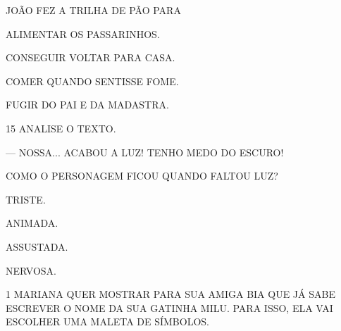 JOÃO FEZ A TRILHA DE PÃO PARA

\begin{escolha}[itemsep=-5pt]
\item ALIMENTAR OS PASSARINHOS.

\item CONSEGUIR VOLTAR PARA CASA.

\item COMER QUANDO SENTISSE FOME.

\item FUGIR DO PAI E DA MADASTRA.
\end{escolha}

\num{15} ANALISE O TEXTO.

\begin{myquote}
--- NOSSA... ACABOU A LUZ! TENHO MEDO DO ESCURO!
\end{myquote}

COMO O PERSONAGEM FICOU QUANDO FALTOU LUZ?

\begin{multicols}{2}
\begin{escolha}
\item TRISTE.

\item ANIMADA.

\item ASSUSTADA.

\item NERVOSA.
\end{escolha}
\end{multicols}

\pagebreak



\pagebreak

\num{1} MARIANA QUER MOSTRAR PARA SUA AMIGA BIA QUE JÁ SABE ESCREVER O NOME DA SUA GATINHA MILU. PARA ISSO, ELA VAI ESCOLHER UMA MALETA DE SÍMBOLOS. 

